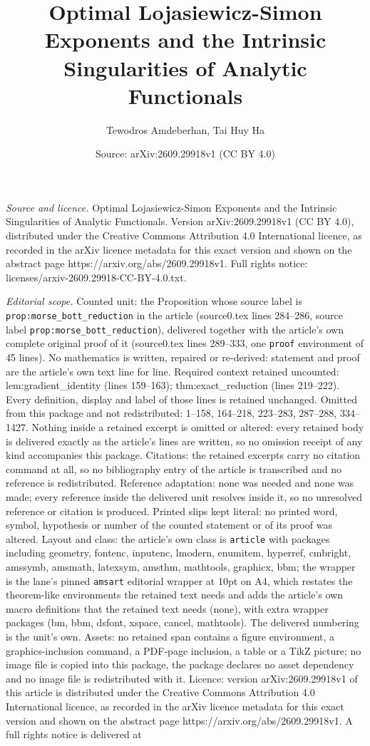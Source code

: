 \documentclass[10pt,a4paper]{amsart}
\title[Optimal Lojasiewicz-Simon Exponents and the Intrinsic Singul]{Optimal Lojasiewicz-Simon Exponents and the Intrinsic Singularities of Analytic Functionals}
\author{Tewodros Amdeberhan, Tai Huy Ha}
\date{Source: arXiv:2609.29918v1 (CC BY 4.0)}
\begin{document}
\maketitle

\noindent\emph{Source and licence.} Optimal Lojasiewicz-Simon Exponents and the Intrinsic Singularities of Analytic Functionals. Version arXiv:2609.29918v1 (CC BY 4.0), distributed under the Creative Commons Attribution 4.0 International licence, as recorded in the arXiv licence metadata for this exact version and shown on the abstract page https://arxiv.org/abs/2609.29918v1. Full rights notice: licenses/arxiv-2609.29918-CC-BY-4.0.txt.\par\smallskip

\noindent\textit{Editorial scope.} Counted unit: the Proposition whose source label is \texttt{prop:morse\_bott\_reduction} in the article (source0.tex lines 284--286, source label \texttt{prop:morse\_bott\_reduction}), delivered together with the article's own complete original proof of it (source0.tex lines 289--333, one \texttt{proof} environment of 45 lines). No mathematics is written, repaired or re-derived: statement and proof are the article's own text line for line. Required context retained uncounted: lem:gradient\_identity (lines 159--163); thm:exact\_reduction (lines 219--222). Every definition, display and label of those lines is retained unchanged. Omitted from this package and not redistributed: 1--158, 164--218, 223--283, 287--288, 334--1427. Nothing inside a retained excerpt is omitted or altered: every retained body is delivered exactly as the article's lines are written, so no omission receipt of any kind accompanies this package. Citations: the retained excerpts carry no citation command at all, so no bibliography entry of the article is transcribed and no reference is redistributed. Reference adaptation: none was needed and none was made; every reference inside the delivered unit resolves inside it, so no unresolved reference or citation is produced. Printed slips kept literal: no printed word, symbol, hypothesis or number of the counted statement or of its proof was altered. Layout and class: the article's own class is \texttt{article} with packages including geometry, fontenc, inputenc, lmodern, enumitem, hyperref, cmbright, amssymb, amsmath, latexsym, amsthm, mathtools, graphicx, bbm; the wrapper is the lane's pinned \texttt{amsart} editorial wrapper at 10pt on A4, which restates the theorem-like environments the retained text needs and adds the article's own macro definitions that the retained text needs (none), with extra wrapper packages (bm, bbm, dsfont, xspace, cancel, mathtools). The delivered numbering is the unit's own. Assets: no retained span contains a figure environment, a graphics-inclusion command, a PDF-page inclusion, a table or a TikZ picture; no image file is copied into this package, the package declares no asset dependency and no image file is redistributed with it. Licence: version arXiv:2609.29918v1 of this article is distributed under the Creative Commons Attribution 4.0 International licence, as recorded in the arXiv licence metadata for this exact version and shown on the abstract page https://arxiv.org/abs/2609.29918v1. A full rights notice is delivered at 
\end{document}
